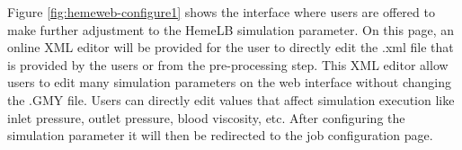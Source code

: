 \noindent%
\begin{minipage}{\linewidth}%
\label{fig:hemeweb-configure1}%
\end{minipage}

\vspace{1cm}

Figure \ref{fig:hemeweb-configure1} shows the interface where users are offered to make further adjustment to the HemeLB simulation parameter. On this page, an online XML editor will be provided for the user to directly edit the .xml file that is provided by the users or from the  pre-processing step. This XML editor allow users to edit many simulation parameters on the web interface without changing the .GMY file. Users can directly edit values that affect simulation execution like inlet pressure, outlet pressure, blood viscosity, etc. After configuring the simulation parameter it will then be redirected to the job configuration page.



\vspace{1cm}

\noindent%
\begin{minipage}{\linewidth}%
\label{fig:hemeweb-configure2}%
\end{minipage}


